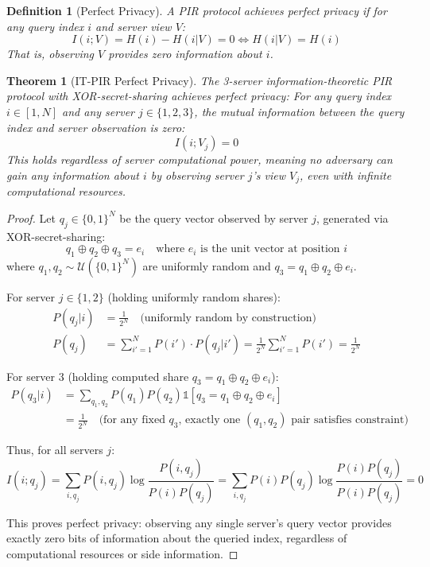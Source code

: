 \documentclass[12pt,a4paper]{article}
\newtheorem{theorem}{Theorem}
\newtheorem{definition}{Definition}
\begin{document}
\begin{definition}[Perfect Privacy]
A PIR protocol achieves perfect privacy if for any query index $i$ and server view $V$:
\[
I(i; V) = H(i) - H(i|V) = 0 \Leftrightarrow H(i|V) = H(i)
\]
That is, observing $V$ provides zero information about $i$.
\end{definition}

\begin{theorem}[IT-PIR Perfect Privacy]
\label{thm:itpir_perfect_privacy}
The 3-server information-theoretic PIR protocol with XOR-secret-sharing achieves perfect privacy: For any query index $i \in [1,N]$ and any server $j \in \{1,2,3\}$, the mutual information between the query index and server observation is zero:
\[
I(i; V_j) = 0
\]
This holds regardless of server computational power, meaning no adversary can gain any information about $i$ by observing server $j$'s view $V_j$, even with infinite computational resources.
\end{theorem}

\begin{proof}
Let $q_j \in \{0,1\}^N$ be the query vector observed by server $j$, generated via XOR-secret-sharing:
\[
q_1 \oplus q_2 \oplus q_3 = e_i \quad \text{where } e_i \text{ is the unit vector at position } i
\]
where $q_1, q_2 \sim \mathcal{U}(\{0,1\}^N)$ are uniformly random and $q_3 = q_1 \oplus q_2 \oplus e_i$.

For server $j \in \{1,2\}$ (holding uniformly random shares):
\begin{align*}
P(q_j | i) &= \frac{1}{2^N} \quad \text{(uniformly random by construction)} \\
P(q_j) &= \sum_{i'=1}^N P(i') \cdot P(q_j | i') = \frac{1}{2^N} \sum_{i'=1}^N P(i') = \frac{1}{2^N}
\end{align*}

For server 3 (holding computed share $q_3 = q_1 \oplus q_2 \oplus e_i$):
\begin{align*}
P(q_3 | i) &= \sum_{q_1, q_2} P(q_1) P(q_2) \mathbb{1}[q_3 = q_1 \oplus q_2 \oplus e_i] \\
&= \frac{1}{2^N} \quad \text{(for any fixed $q_3$, exactly one $(q_1, q_2)$ pair satisfies constraint)}
\end{align*}

Thus, for all servers $j$:
\[
I(i; q_j) = \sum_{i,q_j} P(i, q_j) \log \frac{P(i,q_j)}{P(i)P(q_j)} = \sum_{i,q_j} P(i) P(q_j) \log \frac{P(i) P(q_j)}{P(i)P(q_j)} = 0
\]

This proves perfect privacy: observing any single server's query vector provides exactly zero bits of information about the queried index, regardless of computational resources or side information.
\end{proof}
\end{document}
